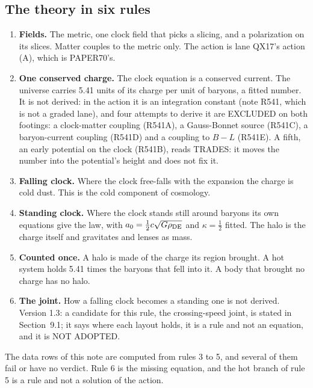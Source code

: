 \documentclass[10pt]{article}
\begin{document}
\subsection{The theory in six rules}
\begin{enumerate}
\item \textbf{Fields.} The metric, one clock field that picks a slicing, and a polarization on its slices. Matter couples to the metric only. The action is lane QX17's action (A), which is PAPER70's.
\item \textbf{One conserved charge.} The clock equation is a conserved current. The universe carries 5.41 units of its charge per unit of baryons, a fitted number. It is not derived: in the action it is an integration constant (note R541, which is not a graded lane), and four attempts to derive it are EXCLUDED on both footings: a clock-matter coupling (R541A), a Gauss-Bonnet source (R541C), a baryon-current coupling (R541D) and a coupling to $B-L$ (R541E). A fifth, an early potential on the clock (R541B), reads TRADES: it moves the number into the potential's height and does not fix it.
\item \textbf{Falling clock.} Where the clock free-falls with the expansion the charge is cold dust. This is the cold component of cosmology.
\item \textbf{Standing clock.} Where the clock stands still around baryons its own equations give the law, with $a_0=\tfrac12c\sqrt{G\rho_{\rm DE}}$ and $\kappa=\tfrac12$ fitted. The halo is the charge itself and gravitates and lenses as mass.
\item \textbf{Counted once.} A halo is made of the charge its region brought. A hot system holds 5.41 times the baryons that fell into it. A body that brought no charge has no halo.
\item \textbf{The joint.} How a falling clock becomes a standing one is not derived. Version 1.3: a candidate for this rule, the crossing-speed joint, is stated in Section~9.1; it says where each layout holds, it is a rule and not an equation, and it is NOT ADOPTED.
\end{enumerate}
The data rows of this note are computed from rules 3 to 5, and several of them fail or have no verdict. Rule 6 is the missing equation, and the hot branch of rule 5 is a rule and not a solution of the action.
\end{document}
